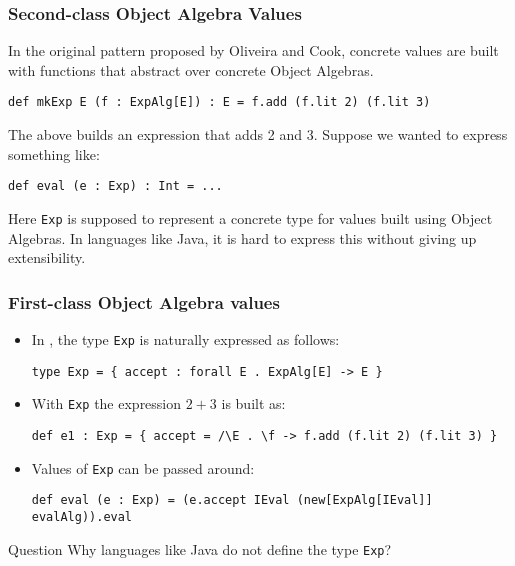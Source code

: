\documentclass{beamer}
\begin{document}
\begin{frame}[fragile]
  \frametitle{Second-class Object Algebra Values}

In the original pattern proposed by Oliveira and Cook, concrete values are built
with functions that abstract over concrete Object Algebras.


\begin{exampleblock}{}
\begin{lstlisting}
def mkExp E (f : ExpAlg[E]) : E = f.add (f.lit 2) (f.lit 3)
\end{lstlisting}
\end{exampleblock}

The above builds an expression that adds 2 and 3. \pause Suppose we wanted to
express something like:

\begin{exampleblock}{}
\begin{lstlisting}
def eval (e : Exp) : Int = ...
\end{lstlisting}
\end{exampleblock}


Here \lstinline{Exp} is supposed to represent a concrete type for values built using
Object Algebras. \pause In languages like Java, it is hard to express this without
giving up extensibility.

\end{frame}


\begin{frame}[fragile]
  \frametitle{First-class Object Algebra values}

  \begin{itemize}[<+->]
  \item  In \name, the type \lstinline{Exp} is naturally expressed as follows:
\begin{lstlisting}
type Exp = { accept : forall E . ExpAlg[E] -> E }
\end{lstlisting}
  \item With \lstinline{Exp} the expression $2 + 3$ is built as:
\begin{lstlisting}
def e1 : Exp = { accept = /\E . \f -> f.add (f.lit 2) (f.lit 3) }
\end{lstlisting}
  \item Values of \lstinline{Exp} can be passed around:
\begin{lstlisting}
def eval (e : Exp) = (e.accept IEval (new[ExpAlg[IEval]] evalAlg)).eval
\end{lstlisting}

  \end{itemize}

\pause

  \begin{alertblock}{Question}
    Why languages like Java do not define the type \lstinline{Exp}?
  \end{alertblock}

\end{frame}
\end{document}
